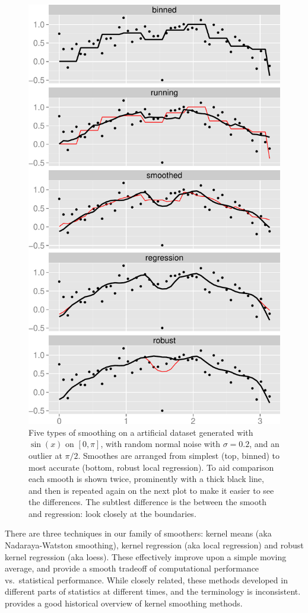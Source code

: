 \documentclass[journal]{vgtc}                %
\begin{document}
\begin{figure}[htb]
 \centering
 \includegraphics[width=0.75\linewidth]{smooth-types}
 \caption{Five types of smoothing on a artificial dataset generated with $\sin(x)$ on $[0, \pi]$, with random normal noise with $\sigma = 0.2$, and an outlier at $\pi / 2$. Smoothes are arranged from simplest (top, binned) to most accurate (bottom, robust local regression). To aid comparison each smooth is shown twice, prominently with a thick black line, and then is repeated again on the next plot to make it easier to see the differences.  The subtlest difference is the between the smooth and regression: look closely at the boundaries.}
 \label{fig:smooth-types}
\end{figure}

There are three techniques in our family of smoothers: kernel means (aka Nadaraya-Watston smoothing), kernel regression (aka local regression) and robust kernel regression (aka loess). These effectively improve upon a simple moving average, and provide a smooth tradeoff of computational performance vs.\ statistical performance. While closely related, these methods developed in different parts of statistics at different times, and the terminology is inconsistent. \citep{cleveland:1996} provides a good historical overview of kernel smoothing methods.
\end{document}
